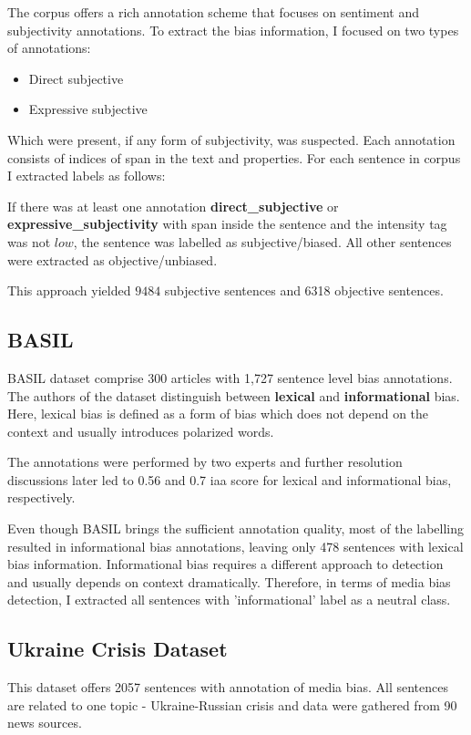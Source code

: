 The corpus offers a rich annotation scheme \cite{wiebe2005annotating} that focuses on sentiment and subjectivity annotations.
\newpage
To extract the bias information, I focused on two types of annotations:
\begin{itemize}
    \item Direct subjective
    \item Expressive subjective
\end{itemize}
Which were present, if any form of subjectivity, was suspected. Each annotation consists of indices of span in the text and properties. For each sentence in corpus I extracted labels as follows:

If there was at least one annotation \textbf{direct\_subjective} or \textbf{expressive\_subjectivity} with span inside the sentence and the intensity tag was not $low$, the sentence was labelled as subjective/biased. All other sentences were extracted as objective/unbiased.

This approach yielded $9484$ subjective sentences and 6318 objective sentences.




\subsection{BASIL}
BASIL dataset \cite{fan2019plain} comprise 300 articles with 1,727 sentence level bias annotations. The authors of the dataset distinguish between \textbf{lexical} and \textbf{informational} bias. Here, lexical bias is defined as a form of bias which does not depend on the context and usually introduces polarized words.

The annotations were performed by two experts and further resolution discussions later led to 0.56 and 0.7 \Gls{iaa} score for lexical and informational bias, respectively.

Even though BASIL brings the sufficient annotation quality, most of the labelling resulted in informational bias annotations, leaving only 478 sentences with lexical bias information. Informational bias requires a different approach to detection \cite{van2020context} and usually depends on context dramatically. Therefore, in terms of media bias detection, I extracted all sentences with 'informational' label as a neutral class.




\subsection{Ukraine Crisis Dataset}
This dataset \cite{farber2020multidimensional} offers 2057 sentences with annotation of media bias. All sentences are related to one topic - Ukraine-Russian crisis and data were gathered from 90 news sources.

